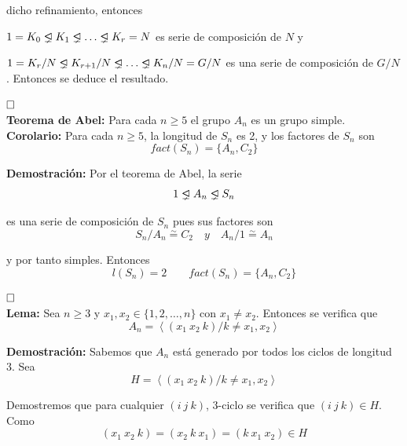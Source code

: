 \documentclass{article}
\newcommand{\unlhdneq}{%
  \mathrel{\ooalign{$\lneq$\cr\raise.22ex\hbox{$\lhd$}\cr}}}
\begin{document}
dicho refinamiento, entonces

$1=K_0\unlhdneq K_1\unlhdneq \ldots \unlhdneq K_r=N$ es serie de composición de $N$ y

$1=K_r/N\unlhdneq K_{r+1}/N\unlhdneq \ldots\unlhdneq K_n/N=G/N$ es una serie de composición de $G/N$. Entonces se deduce el resultado.

$\hfill\square$ \\

\textbf{Teorema de Abel:} Para cada $n\geq 5$ el grupo $A_n$ es un grupo simple. \\

\textbf{Corolario:} Para cada $n\geq 5$, la longitud de $S_n$ es 2, y los factores de $S_n$ son
\begin{equation*}
fact(S_n)=\{A_n,C_2\}
\end{equation*}

\textbf{Demostración:} Por el teorema de Abel, la serie
\begin{equation*}
1\unlhdneq A_n\unlhdneq S_n
\end{equation*}

es una serie de composición de $S_n$ pues sus factores son
\begin{equation*}
S_n/A_n\overset{\sim}{=} C_2\quad y \quad A_n/1\overset{\sim}{=}A_n
\end{equation*}

y por tanto simples. Entonces
\begin{equation*}
l(S_n)=2\qquad fact(S_n)=\{A_n,C_2\}
\end{equation*}

$\hfill\square$ \\

\textbf{Lema:} Sea $n\geq 3$ y $x_1,x_2\in\{1,2,\ldots,n\}$ con $x_1\neq x_2$. Entonces se verifica que
\begin{equation*}
A_n=\left\langle (x_1\:x_2\:k)/k\neq x_1,x_2\right\rangle
\end{equation*}

\textbf{Demostración:} Sabemos que $A_n$ está generado por todos los ciclos de longitud 3. Sea
\begin{equation*}
H=\left\langle (x_1\:x_2\:k)/k\neq x_1,x_2\right\rangle
\end{equation*}

Demostremos que para cualquier $(i\:j\:k)$, 3-ciclo se verifica que $(i\:j\:k)\in H$. Como
\begin{equation*}
(x_1\:x_2\:k)=(x_2\:k\:x_1)=(k\:x_1\:x_2)\in H
\end{equation*}
\end{document}

